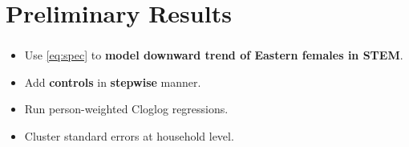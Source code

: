 \documentclass[11pt, aspectratio=1610, xcolor={dvipsnames}]{beamer}
\newcommand{\highlight}[1]{\textbf{\textcolor{PineGreen}{#1}}}
\begin{document}
	\section{Preliminary Results}
	\begin{frame}
		\frametitle{}
		
		\begin{itemize}
			\item Use \eqref{eq:spec} to \highlight{model downward trend of Eastern females in STEM}.
			\item Add \highlight{controls} in \highlight{stepwise} manner.
			\item Run person-weighted Cloglog regressions.
			\item Cluster standard errors at household level.
		\end{itemize}
		
	\end{frame}
	
\end{document}
